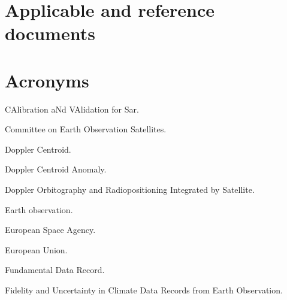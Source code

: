 \documentclass[a4paper,10pt,english]{sphinxmanual}
\begin{document}
\section{Applicable and reference documents}
\label{\detokenize{01_introduction:applicable-and-reference-documents}}

\section{Acronyms}
\label{\detokenize{01_introduction:acronyms}}\begin{description}
\sphinxAtStartPar
CAlibration aNd VAlidation for Sar.

\sphinxAtStartPar
Committee on Earth Observation Satellites.

\sphinxAtStartPar
Doppler Centroid.

\sphinxAtStartPar
Doppler Centroid Anomaly.

\sphinxAtStartPar
Doppler Orbitography and Radiopositioning Integrated by Satellite.

\sphinxAtStartPar
Earth observation.

\sphinxAtStartPar
European Space Agency.

\sphinxAtStartPar
European Union.

\sphinxAtStartPar
Fundamental Data Record.

\sphinxAtStartPar
Fidelity and Uncertainty in Climate Data Records from Earth Observation.


\end{description}
\end{document}
